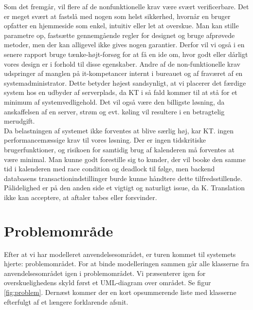 \documentclass[12pt]{article}   %
\begin{document}
Som det fremgår, vil flere af de nonfunktionelle krav være svært verificerbare. 
Det er meget svært at fastslå med nogen som helst sikkerhed, hvornår en bruger
opfatter en hjemmeside som enkel, intuitiv eller let at overskue. Man kan stille
parametre op, fastsætte gennemgående regler for designet og bruge afprøvede
metoder, men der kan alligevel ikke gives nogen garantier. Derfor vil vi også
i en senere rapport bruge tænke-højt-forsøg for at få en ide om, hvor godt
eller dårligt vores design er i forhold til disse egenskaber. Andre af de
non-funktionelle krav udspringer af manglen på it-kompetancer internt i bureauet og af
fraværet af en systemadministrator. Dette betyder højest sandsynligt, at vi 
placerer det færdige system hos en udbyder af serverplads, da KT i så fald kommer 
til at stå for et minimum af systemvedligehold. Det vil også være den billigste
løsning, da anskaffelsen af en server, strøm og evt. køling vil resultere i en 
betragtelig merudgift. \\
Da belastningen af systemet ikke forventes at blive særlig høj, kar KT. ingen 
performancemæssige krav til vores løsning. Der er ingen tidskritiske
brugerfunktioner, og risikoen for samtidig brug af kalenderen må forventes at
være minimal. Man kunne godt forestille sig to kunder, der vil booke den samme 
tid i kalenderen med race condition og deadlock til følge, men backend
databasens transactionindstillinger burde kunne håndtere dette
tilfredsstillende. Pålidelighed er på den anden side et vigtigt og naturligt
issue, da K. Translation ikke kan acceptere, at aftaler tabes eller
forsvinder. \\ 

		


\section{Problemområde}
Efter at vi har modelleret anvendelsesområdet, er turen kommet til systemets 
hjerte: problemområdet. For at binde modelleringen sammen går alle 
klasserne fra anvendelsesområdet igen i problemområdet. Vi præsenterer igen for
overskuelighedens skyld først et UML-diagram over området. Se figur 
\ref{fig:problem}. Dernæst kommer der en kort opsummerende liste med klasserne 
efterfulgt af et længere forklarende afsnit.  
\end{document}
